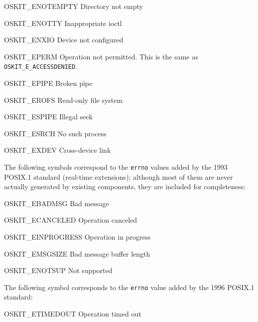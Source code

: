 \begin{apidesc}
\begin{icsymlist}
	\item[OSKIT_ENOTEMPTY]		Directory not empty
	\item[OSKIT_ENOTTY]		Inappropriate ioctl
	\item[OSKIT_ENXIO]		Device not configured
	\item[OSKIT_EPERM]		Operation not permitted.
					This is the same as
					\texttt{OSKIT_E_ACCESSDENIED}.
	\item[OSKIT_EPIPE]		Broken pipe
	\item[OSKIT_EROFS]		Read-only file system
	\item[OSKIT_ESPIPE]		Illegal seek
	\item[OSKIT_ESRCH]		No such process
	\item[OSKIT_EXDEV]		Cross-device link
	\end{icsymlist}

	The following symbols correspond to the \texttt{errno} values
	added by the 1993 POSIX.1 standard (real-time extensions);
	although most of them are never actually generated
	by existing \oskit{} components,
	they are included for completeness:
	\begin{icsymlist}
	\item[OSKIT_EBADMSG]		Bad message
	\item[OSKIT_ECANCELED]		Operation canceled
	\item[OSKIT_EINPROGRESS]		Operation in progress
	\item[OSKIT_EMSGSIZE]		Bad message buffer length
	\item[OSKIT_ENOTSUP]		Not supported
	\end{icsymlist}

	The following symbol corresponds to the \texttt{errno} value
	added by the 1996 POSIX.1 standard:
	\begin{icsymlist}
	\item[OSKIT_ETIMEDOUT]		Operation timed out
	\end{icsymlist}


\end{apidesc}
